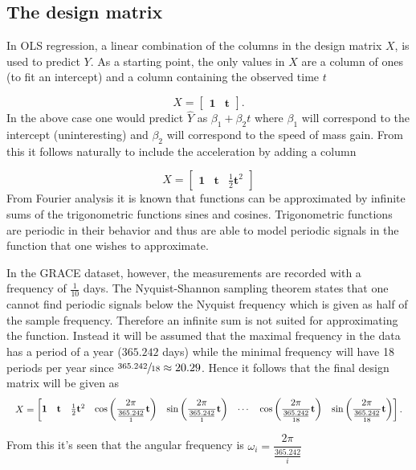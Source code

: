 \subsection{The design matrix}
In OLS regression, a linear combination of the columns in the design matrix $X$, is used to predict $Y$.
As a starting point, the only values in $X$ are a column of ones (to fit an intercept) and a column containing the observed time $t$

\begin{equation}
X = \left[\begin{matrix} \mathbf{1} & \mathbf{t} \end{matrix}\right].
\end{equation}
In the above case one would predict $\hat{Y}$ as $\beta_1 + \beta_2 t$ where $\beta_1$ will correspond to the intercept (uninteresting) and $\beta_2$ will correspond to the speed of mass gain.
From this it follows naturally to include the acceleration by adding a column

\begin{equation}
X = \left[\begin{matrix} \mathbf{1} & \mathbf{t} & \frac{1}{2} \mathbf{t}^2 \end{matrix}\right]
\end{equation} 
From Fourier analysis it is known that functions can be approximated by infinite sums of the trigonometric functions sines and cosines.
Trigonometric functions are periodic in their behavior and thus are able to model periodic signals in the function that one wishes to approximate.

In the GRACE dataset, however, the measurements are recorded with a frequency of $\frac{1}{10}$ days.
The Nyquist-Shannon sampling theorem states that one cannot find periodic signals below the Nyquist frequency which is given as half of the sample frequency. 
Therefore an infinite sum is not suited for approximating the function. 
Instead it will be assumed that the maximal frequency in the data has a period of a year ($365.242$ days) while the minimal frequency will have 18 periods per year since  $\sfrac{365.242}{18} \approx 20.29$. Hence it follows that the final design matrix will be given as
\begin{equation*}
\resizebox{\textwidth}{!}{$
X = \left[\begin{matrix}
	\mathbf{1} &
	\mathbf{t} &
	\frac{1}{2} \mathbf{t}^2 &
	\cos\left( \dfrac{2 \pi}{\frac{365.242}{1}} \mathbf{t} \right) &
	\sin\left( \dfrac{2 \pi}{\frac{365.242}{1}} \mathbf{t} \right) &
	\cdots &
	\cos\left( \dfrac{2 \pi}{\frac{365.242}{18}} \mathbf{t} \right) &
	\sin\left( \dfrac{2 \pi}{\frac{365.242}{18}} \mathbf{t} \right)
\end{matrix}\right].
$}
\end{equation*}

From this it's seen that the angular frequency is $\omega_i =  \dfrac{2 \pi}{\frac{365.242}{i}}$
